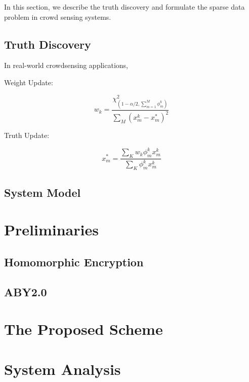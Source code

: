 \documentclass[conference]{IEEEtran}
\begin{document}
In this section, we describe the truth discovery and formulate the sparse data problem in crowd sensing systems.

\subsection{Truth Discovery}

In real-world crowdsensing applications, 

Weight Update:

$$w_k = \frac{\chi_{(1-\alpha/2, \sum_{m=1}^M \phi_m^k)}^2}{\sum_M (x_m^k - x_m^*)^2}$$

Truth Update:

$$x_m^* = \frac{\sum_K w_k \phi_m^k x_m^k }{\sum_K \phi_m^k x_m^k}$$

\subsection{System Model}


\section{Preliminaries}

\subsection{Homomorphic Encryption}

\subsection{ABY2.0}

\section{The Proposed Scheme}

\section{System Analysis}




\vspace{12pt}
\end{document}

